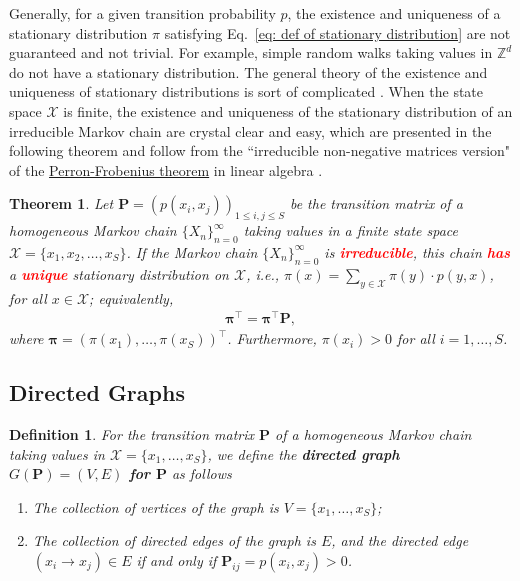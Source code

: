 \documentclass[11pt,letterpaper, leqno]{article}
\newtheorem{theorem}{Theorem}
\newtheorem{definition}{Definition}
\numberwithin{equation}{section}
\numberwithin{theorem}{section}
\numberwithin{lemma}{section}
\numberwithin{corollary}{section}
\numberwithin{definition}{section}
\numberwithin{proposition}{section}
\numberwithin{remark}{section}
\numberwithin{example}{section}
\newcommand{\T}{\intercal}
\begin{document}
Generally, for a given transition probability $p$, the existence and uniqueness of a stationary distribution $\pi$ satisfying Eq.~\eqref{eq: def of stationary distribution} are not guaranteed and not trivial. For example, simple random walks taking values in $\mathbb{Z}^d$ do not have a stationary distribution. The general theory of the existence and uniqueness of stationary distributions is sort of complicated \citep[][Section 6.5]{durrett2019probability}. When the state space $\mathcal{X}$ is finite, the existence and uniqueness of the stationary distribution of an irreducible Markov chain are crystal clear and easy, which are presented in the following theorem and follow from the ``irreducible non-negative matrices version" of the \href{https://web.archive.org/web/20100307021652/http://www.matrixanalysis.com/Chapter8.pdf}{Perron-Frobenius theorem} in linear algebra \citep[][Section 8.3]{meyer2000matrix}.
\begin{theorem}\label{thm: existence of stationary distribution for finite state spaces}
Let $\boldsymbol{P}=\left(p(x_i, x_j)\right)_{1\le i,j\le S}$ be the transition matrix of a homogeneous Markov chain $\{X_n\}_{n=0}^\infty$ taking values in a finite state space $\mathcal{X}=\{x_1, x_2,\ldots, x_S\}$. If the Markov chain $\{X_n\}_{n=0}^\infty$ is \textbf{\textcolor{red}{irreducible}}, this chain \textbf{\textcolor{red}{has}} a \textbf{\textcolor{red}{unique}} stationary distribution on $\mathcal{X}$, i.e., $\pi(x)=\sum_{y\in\mathcal{X}}\pi(y)\cdot p(y,x)$, for all $x\in\mathcal{X}$; equivalently,
\begin{align}\label{eq: def of stationary distribution matrix form}
    \boldsymbol{\pi}^\T=\boldsymbol{\pi}^\T\boldsymbol{P},
\end{align}
where $\boldsymbol{\pi}=(\pi(x_1), \ldots, \pi(x_S))^\T$. Furthermore, $\pi(x_i)>0$ for all $i=1,\ldots,S$.
\end{theorem}


\subsection{Directed Graphs}

\begin{definition}\label{def: directed graph of P}
For the transition matrix $\boldsymbol{P}$ of a homogeneous Markov chain taking values in $\mathcal{X}=\{x_1,\ldots,x_S\}$, we define the \textbf{directed graph $G(\boldsymbol{P})=(V,E)$ for $\boldsymbol{P}$} as follows
\begin{enumerate}
    \item The collection of vertices of the graph is $V=\{x_1,\ldots,x_S\}$;
    \item The collection of directed edges of the graph is $E$, and the directed edge $(x_i\rightarrow x_j)\in E$ if and only if $\boldsymbol{P}_{ij}=p(x_i,x_j)>0$.
\end{enumerate}
\end{definition}
\end{document}
